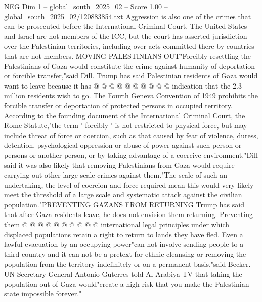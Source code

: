 \begin{textsample}{NEG Dim 1 – global\_south\_2025\_02 – Score 1.00 – global\_south\_2025\_02/120883854.txt}
Aggression is also one of the crimes that can be prosecuted before the International Criminal Court.
The United States and Israel are not members of the ICC, but the court has asserted jurisdiction over the Palestinian territories, including over acts committed there by countries that are not members.
MOVING PALESTINIANS OUT"Forcibly resettling the Palestinians of Gaza would constitute the crime against humanity of deportation or forcible transfer,"said Dill.
Trump has said Palestinian residents of Gaza would want to leave because it has @ @ @ @ @ @ @ @ @ @ indication that the 2.3 million residents wish to go.
The Fourth Geneva Convention of 1949 prohibits the forcible transfer or deportation of protected persons in occupied territory.
According to the founding document of the International Criminal Court, the Rome Statute,"the term ' forcibly ' is not restricted to physical force, but may include threat of force or coercion, such as that caused by fear of violence, duress, detention, psychological oppression or abuse of power against such person or persons or another person, or by taking advantage of a coercive environment."Dill said it was also likely that removing Palestinians from Gaza would require carrying out other large-scale crimes against them."The scale of such an undertaking, the level of coercion and force required mean this would very likely meet the threshold of a large scale and systematic attack against the civilian population."PREVENTING GAZANS FROM RETURNING Trump has said that after Gaza residents leave, he does not envision them returning.
Preventing them @ @ @ @ @ @ @ @ @ @ international legal principles under which displaced populations retain a right to return to lands they have fled.
Even a lawful evacuation by an occupying power"can not involve sending people to a third country and it can not be a pretext for ethnic cleansing or removing the population from the territory indefinitely or on a permanent basis,"said Becker.
UN Secretary-General Antonio Guterres told Al Arabiya TV that taking the population out of Gaza would"create a high risk that you make the Palestinian state impossible forever."

\end{textsample}
